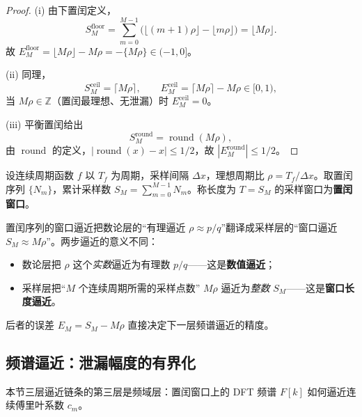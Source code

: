 \begin{proof}
(i) 由下置闰定义，
\[
S_M^{\mathrm{floor}}=\sum_{m=0}^{M-1}\bigl(\lfloor (m+1)\rho\rfloor-\lfloor m\rho\rfloor\bigr)=\lfloor M\rho\rfloor.
\]
故 \(E_M^{\mathrm{floor}}=\lfloor M\rho\rfloor-M\rho=-\{M\rho\}\in(-1,0]\)。

(ii) 同理，
\[
S_M^{\mathrm{ceil}}=\lceil M\rho\rceil,\qquad
E_M^{\mathrm{ceil}}=\lceil M\rho\rceil-M\rho\in[0,1),
\]
当 $M\rho\in\mathbb Z$（置闰最理想、无泄漏）时 $E_M^{\mathrm{ceil}}=0$。

(iii) 平衡置闰给出
\[
S_M^{\mathrm{round}}=\operatorname{round}(M\rho),
\]
由 \(\operatorname{round}\) 的定义，\(|\operatorname{round}(x)-x|\le 1/2\)，故 \(|E_M^{\mathrm{round}}|\le 1/2\)。
\end{proof}

\begin{definition}[置闰窗口]\label{def:intercalation_window_harmonic}
设连续周期函数 \(f\) 以 \(T_f\) 为周期，采样间隔 \(\Delta x\)，理想周期比 \(\rho=T_f/\Delta x\)。取置闰序列 \(\{N_m\}\)，累计采样数 \(S_M=\sum_{m=0}^{M-1}N_m\)。称长度为 \(T=S_M\) 的采样窗口为\textbf{置闰窗口}。
\end{definition}

\begin{remark}[窗口逼近的一般原理]\label{rem:window_approximation_principle}
置闰序列的窗口逼近把数论层的“有理逼近 $\rho\approx p/q$”翻译成采样层的“窗口逼近 $S_M\approx M\rho$”。两步逼近的意义不同：
\begin{itemize}
    \item 数论层把 $\rho$ 这个\emph{实数}逼近为有理数 $p/q$——这是\textbf{数值逼近}；
    \item 采样层把“$M$ 个连续周期所需的采样点数” $M\rho$ 逼近为\emph{整数} $S_M$——这是\textbf{窗口长度逼近}。
\end{itemize}
后者的误差 $E_M=S_M-M\rho$ 直接决定下一层频谱逼近的精度。
\end{remark}

\subsection{频谱逼近：泄漏幅度的有界化}

本节三层逼近链条的第三层是频域层：置闰窗口上的 DFT 频谱 $F[k]$ 如何逼近连续傅里叶系数 $c_m$。

